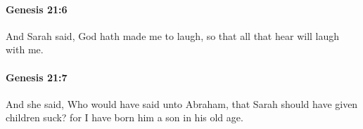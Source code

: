		\paragraph{Genesis 21:6} %
			\label{GENESIS-21-6}

			And Sarah said, God hath made me to laugh, so that all that hear will laugh with me.


		\paragraph{Genesis 21:7} %
			\label{GENESIS-21-7}

			And she said, Who would have said unto Abraham, that Sarah should have given children suck? for I have born him a son in his old age.


